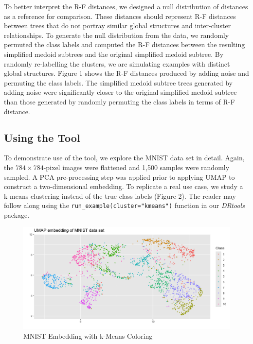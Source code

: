\documentclass{article}
\begin{document}
To better interpret the R-F distances, we designed a null distribution of distances as a reference for comparison. These distances should represent R-F distances between trees that do not portray similar global structures and inter-cluster relationships. To generate the null distribution from the data, we randomly permuted the class labels and computed the R-F distances between the resulting simplified medoid subtrees and the original simplified medoid subtree. By randomly re-labelling the clusters, we are simulating examples with distinct global structures. Figure 1 shows the R-F distances produced by adding noise and permuting the class labels. The simplified medoid subtree trees generated by adding noise were significantly closer to the original simplified medoid subtree than those generated by randomly permuting the class labels in terms of R-F distance.

\subsection{Using the Tool}
To demonstrate use of the tool, we explore the MNIST data set in detail. Again, the $784 \times 784$-pixel images were flattened and 1,500 samples were randomly sampled. A PCA pre-processing step was applied prior to applying UMAP \cite{UMAP} to construct a two-dimensional embedding. To replicate a real use case, we study a k-means clustering instead of the true class labels (Figure 2). The reader may follow along using the \texttt{run\_example(cluster="kmeans")} function in our \textit{DRtools} package.

\renewcommand{\figurename}{Figure}
\renewcommand{\thefigure}{2}
\begin{figure}[!t]
\centering
\includegraphics[scale=0.45]{MNIST kmeans}
\caption{MNIST Embedding with k-Means Coloring}
\end{figure}
\end{document}
